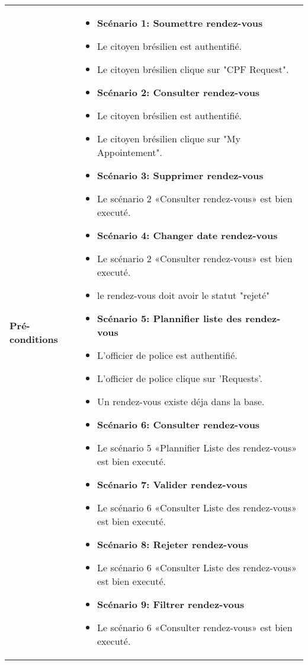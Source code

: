\begin{longtable}{|>{\arraybackslash}p{4.2cm}|>{\arraybackslash}p{12.5cm}|}


\hline
\textbf{Pré-conditions} &
\begin{itemize}[label=]
\item\textbf{Scénario 1:  Soumettre rendez-vous }
 \item Le citoyen brésilien est authentifié.
 \item Le citoyen brésilien clique sur "CPF Request".
 \item\textbf{Scénario 2: Consulter rendez-vous }
 \item Le citoyen brésilien est authentifié.
  \item Le citoyen brésilien clique sur "My Appointement".
  \item\textbf{Scénario 3: Supprimer rendez-vous }
 \item   Le scénario 2 «Consulter rendez-vous» est bien executé.
 \item\textbf{Scénario 4: Changer date rendez-vous}
 \item Le scénario 2 «Consulter rendez-vous» est bien executé.
 \item le rendez-vous doit avoir le statut "rejeté"
  \item\textbf{Scénario 5: Plannifier liste des rendez-vous }
 \item L'officier de police est authentifié.
  \item L'officier de police clique sur 'Requests'.
  \item Un rendez-vous existe déja dans la base.
  \item\textbf{Scénario 6: Consulter rendez-vous }
   \item Le scénario 5 «Plannifier Liste des rendez-vous» est bien executé.
  \item\textbf{Scénario 7: Valider rendez-vous }
 \item   Le scénario 6 «Consulter Liste des rendez-vous» est bien executé.
 \item\textbf{Scénario 8: Rejeter rendez-vous}
 \item Le scénario 6 «Consulter Liste des rendez-vous» est bien executé.
  \item\textbf{Scénario 9: Filtrer rendez-vous}
 \item   Le scénario 6 «Consulter rendez-vous» est bien executé.
\end{itemize} \\





\end{longtable}
